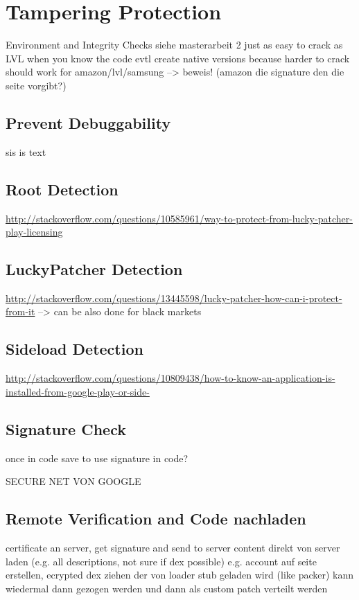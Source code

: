 \section{Tampering Protection}\label{section:tampering}
Environment and Integrity Checks\newline
siehe masterarbeit 2\newline
just as easy to crack as LVL when you know the code\newline
evtl create native versions because harder to crack\newline
should work for amazon/lvl/samsung --> beweis! (amazon die signature den die seite vorgibt?)\newline


\subsection{Prevent Debuggability}\label{subsection:tampering-debuggable}
sis is text
\subsection{Root Detection}\label{subsection:tampering-root}
\url{http://stackoverflow.com/questions/10585961/way-to-protect-from-lucky-patcher-play-licensing}
\subsection{LuckyPatcher Detection}\label{subsection:tampering-luckypatcher}
\url{http://stackoverflow.com/questions/13445598/lucky-patcher-how-can-i-protect-from-it}\newline
--> can be also done for black markets
\subsection{Sideload Detection}\label{subsection:tampering-sideload}
\url{http://stackoverflow.com/questions/10809438/how-to-know-an-application-is-installed-from-google-play-or-side-}
\subsection{Signature Check}\label{subsection:tampering-signature}
once in code \newline
save to use signature in code?\newline

SECURE NET VON GOOGLE
\subsection{Remote Verification and Code nachladen}\label{subsection:external-remote}
certificate an server, get signature and send to server\newline
content direkt von server laden (e.g. all descriptions, not sure if dex possible)\newline
e.g. account auf seite erstellen, ecrypted dex ziehen der von loader stub geladen wird (like packer)
kann wiedermal dann gezogen werden und dann als custom patch verteilt werden\newline
